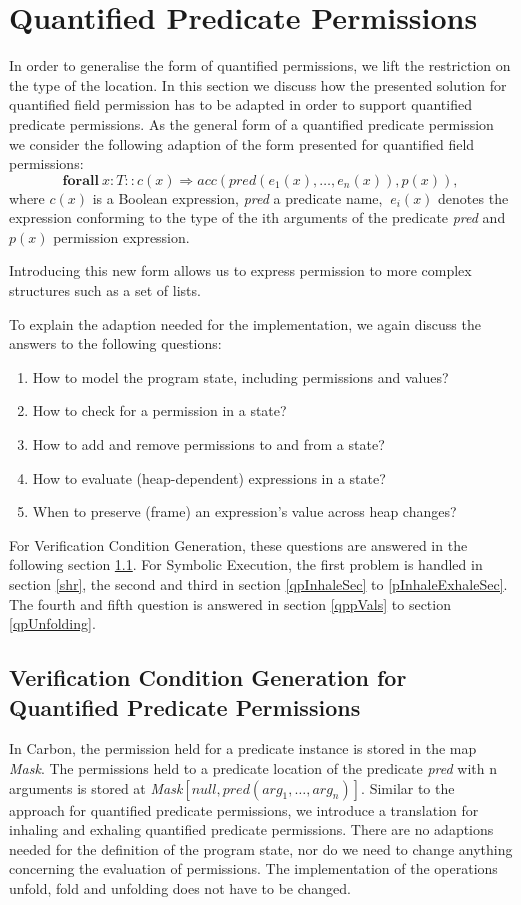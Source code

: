 \documentclass[12pt]{article}
\begin{document}
\section{Quantified Predicate Permissions}
\label{qp}
In order to generalise the form of quantified permissions, we lift the restriction on the type of the location. In this section we discuss how the presented solution for quantified field permission has to be adapted in order to support quantified predicate permissions. 
As the general form of a quantified predicate permission we consider the following adaption of the form presented for quantified field permissions: 
\begin{equation}
 \mathbf{forall} \   x:T :: c(x) \Rightarrow acc(pred(e_1 (x),…,e_n (x)), p(x)), 
\end{equation}
where \(c(x)\) is a Boolean expression, \textit{pred} a predicate name, \(\ e_i(x)\) denotes the expression conforming to the type of the ith arguments of the predicate \textit{pred} and \(p(x)\) permission expression.

Introducing this new form allows us to express permission to more complex structures such as a set of lists.

To explain the adaption needed for the implementation, we again discuss the answers to the following questions:
\begin{enumerate}
\item How to model the program state, including permissions and values?
\item How to check for a permission in a state?
\item How to add and remove permissions to and from a state?
\item How to evaluate (heap-dependent) expressions in a state?
\item When to preserve (frame) an expression's value across heap changes?
\end{enumerate}

For Verification Condition Generation, these questions are answered in the following section \ref{vcgPredicate}. For Symbolic Execution, the first problem is handled in section \ref{shr}, the second and third in section \ref{qpInhaleSec} to \ref{pInhaleExhaleSec}. The fourth and fifth question is answered  in section \ref{qppVals} to section \ref{qpUnfolding}.

\subsection{Verification Condition Generation for Quantified Predicate Permissions}
\label{vcgPredicate}
In Carbon, the permission held for a predicate instance is stored in the map \textit{Mask}. The permissions held to a predicate location of the predicate \textit{pred} with n arguments is stored at \textit{Mask}\([null, pred(arg_1, \dots, arg_n)]\). Similar to the approach for quantified predicate permissions, we introduce a translation for inhaling and exhaling quantified predicate permissions. There are no adaptions needed for the definition of the program state, nor do we need to change anything concerning the evaluation of  permissions. The implementation of the operations unfold, fold and unfolding does not have to be changed. 
\end{document}
